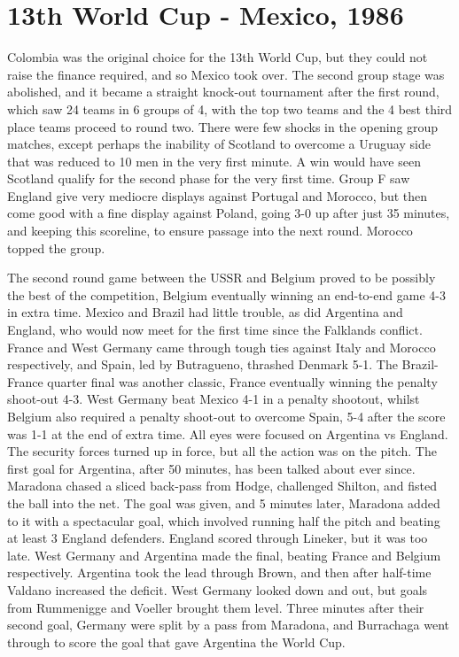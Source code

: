 \section{13th World Cup - Mexico, 1986}
Colombia was the original choice for the 13th World Cup, but they could not
raise the finance required, and so Mexico took over. The second group stage
was abolished, and it became a straight knock-out tournament after the first 
round, which saw 24 teams in 6 groups of 4, with the top two teams and the
4 best third place teams proceed to round two. There were few shocks in the 
opening group matches, except perhaps the inability of Scotland to overcome a
Uruguay side that was reduced to 10 men in the very first minute. A win would
have seen Scotland qualify for the second phase for the very first time. 
Group F saw England give very mediocre displays against Portugal and Morocco, 
but then come good with a fine display against Poland, going 3-0 up after just
35 minutes, and keeping this scoreline, to ensure passage into the next round. 
Morocco topped the group.

The second round game between the USSR and Belgium proved to be possibly 
the best of the competition, Belgium eventually winning an end-to-end game 4-3
in extra time. Mexico and Brazil had little trouble, as did Argentina and 
England, who would now meet for the first time since the Falklands conflict. 
France and West Germany came through tough ties against Italy and Morocco 
respectively, and Spain, led by Butragueno, thrashed Denmark 5-1. The Brazil-
France quarter final was another classic, France eventually winning the penalty
shoot-out 4-3. West Germany beat Mexico 4-1 in a penalty shootout, whilst 
Belgium also required a penalty shoot-out to overcome Spain, 5-4 after the 
score was 1-1 at the end of extra time. All eyes were focused on Argentina vs 
England. The security forces turned up in force, but all the action was on the 
pitch. The first goal for Argentina, after 50 minutes, has been talked about 
ever since. Maradona chased a sliced back-pass from Hodge, challenged Shilton, 
and fisted the ball into the net. The goal was given, and 5 minutes later, 
Maradona added to it with a spectacular goal, which involved running half the 
pitch and beating at least 3 England defenders. England scored through Lineker,
but it was too late. West Germany and Argentina made the final, beating France 
and Belgium respectively. Argentina took the lead through Brown, and then after
half-time Valdano increased the deficit. West Germany looked down and out, but 
goals from Rummenigge and Voeller brought them level. Three minutes after their
second goal, Germany were split by a pass from Maradona, and Burrachaga went 
through to score the goal that gave Argentina the World Cup.
